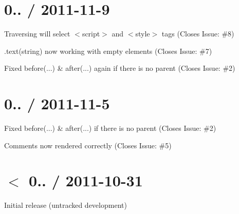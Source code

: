 \section*{0.. / 2011-\/11-\/9 }


\begin{DoxyItemize}
\item Traversing will select {\ttfamily $<$script$>$} and {\ttfamily $<$style$>$} tags (Closes Issue\+: \#8)
\item .text(string) now working with empty elements (Closes Issue\+: \#7)
\item Fixed before(...) \& after(...) again if there is no parent (Closes Issue\+: \#2)
\end{DoxyItemize}

\section*{0.. / 2011-\/11-\/5 }


\begin{DoxyItemize}
\item Fixed before(...) \& after(...) if there is no parent (Closes Issue\+: \#2)
\item Comments now rendered correctly (Closes Issue\+: \#5)
\end{DoxyItemize}

\section*{$<$ 0.. / 2011-\/10-\/31 }


\begin{DoxyItemize}
\item Initial release (untracked development) 
\end{DoxyItemize}